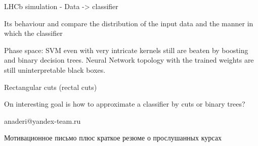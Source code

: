 LHCb simulation - Data -> classifier

Its behaviour and compare the distribution of the input data and the manner in which the classifier 



Phase space: SVM even with very intricate kernels still are beaten by boosting and binary decision trees.
Neural Network topology with the trained weights are still uninterpretable black boxes.

Rectangular cuts (rectal cuts)

On interesting goal is how to approximate a classifier by cuts or binary trees?



anaderi@yandex-team.ru

Мотивационное письмо плюс краткое резюме о прослушанных курсах



